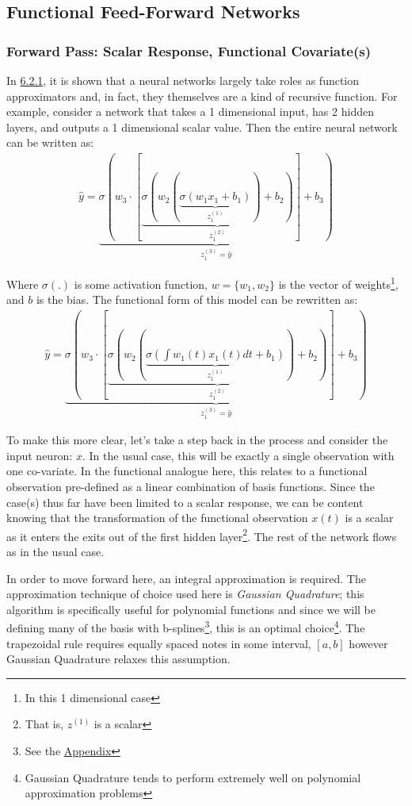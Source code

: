 \documentclass{article}
\begin{document}
\subsection{Functional Feed-Forward Networks}
\label{sec:funcFeedNN}

\subsubsection{Forward Pass: Scalar Response, Functional Covariate(s)}

In \hyperref[sec:nn]{6.2.1}, it is shown that a neural networks largely take roles as function approximators and, in fact, they themselves are a kind of recursive function. For example, consider a network that takes a 1 dimensional input, has 2 hidden layers, and outputs a 1 dimensional scalar value. Then the entire neural network can be written as:
\begin{align}
    \hat{y} = \underbrace{\sigma(w_{3}\cdot[\underbrace{\sigma(w_{2}(\underbrace{\sigma(w_{1}x_{1} + b_{1})}_\text{$z^{(1)}_{1}$}) + b_{2})}_\text{$z^{(2)}_{1}$}] + b_{3})}_\text{$z^{(3)}_{1} = \hat{y}$}
\end{align}

\noindent Where $\sigma(.)$ is some activation function, $w = \{w_{1}, w_{2}\}$ is the vector of weights\footnote{In this 1 dimensional case}, and $b$ is the bias. The functional form of this model can be rewritten as:
\begin{align}
    \hat{y} = \underbrace{\sigma(w_{3}\cdot[\underbrace{\sigma(w_{2}(\underbrace{\sigma(\int w_{1}(t)x_{1}(t)dt + b_{1})}_\text{$z^{(1)}_{1}$}) + b_{2})}_\text{$z^{(2)}_{1}$}] + b_{3})}_\text{$z^{(3)}_{1} = \hat{y}$}
\end{align}

\noindent To make this more clear, let's take a step back in the process and consider the input neuron: $x$. In the usual case, this will be exactly a single observation with one co-variate. In the functional analogue here, this relates to a functional observation pre-defined as a linear combination of basis functions. Since the case(s) thus far have been limited to a scalar response, we can be content knowing that the transformation of the functional observation $x(t)$ is a scalar as it enters the exits out of the first hidden layer\footnote{That is, $z^{(1)}$ is a scalar}. The rest of the network flows as in the usual case.


\noindent In order to move forward here, an integral approximation is required. The approximation technique of choice used here is \textit{Gaussian Quadrature}; this algorithm is specifically useful for polynomial functions \cite{quad4} \cite{quad3} and since we will be defining many of the basis with b-splines\footnote{See the \hyperref[sec:appendix]{Appendix}}, this is an optimal choice\footnote{Gaussian Quadrature tends to perform extremely well on polynomial approximation problems}. The trapezoidal rule requires equally spaced notes in some interval, $[a, b]$ however Gaussian Quadrature relaxes this assumption.
\end{document}
